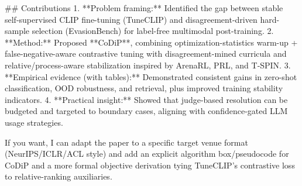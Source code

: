 ## Contributions  
1. **Problem framing:** Identified the gap between stable self-supervised CLIP fine-tuning (TuneCLIP) and disagreement-driven hard-sample selection (EvasionBench) for label-free multimodal post-training.  
2. **Method:** Proposed **CoDiP**, combining optimization-statistics warm-up + false-negative-aware contrastive tuning with disagreement-mined curricula and relative/process-aware stabilization inspired by ArenaRL, PRL, and T‑SPIN.  
3. **Empirical evidence (with tables):** Demonstrated consistent gains in zero-shot classification, OOD robustness, and retrieval, plus improved training stability indicators.  
4. **Practical insight:** Showed that judge-based resolution can be budgeted and targeted to boundary cases, aligning with confidence-gated LLM usage strategies.

If you want, I can adapt the paper to a specific target venue format (NeurIPS/ICLR/ACL style) and add an explicit algorithm box/pseudocode for CoDiP and a more formal objective derivation tying TuneCLIP’s contrastive loss to relative-ranking auxiliaries.